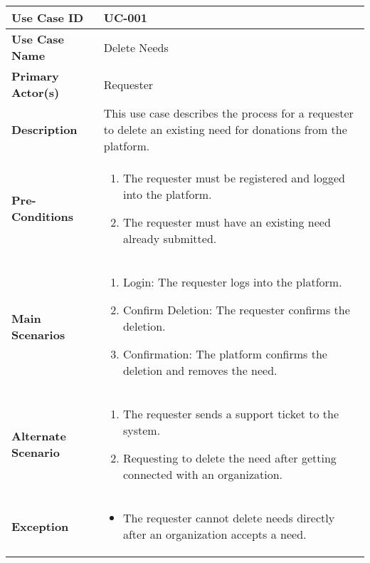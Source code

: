 \begin{table}[!ht]
    \centering
    \renewcommand{\arraystretch}{1.3} %
    \begin{tabularx}{\textwidth}{|l|X|}
        \hline
        \textbf{Use Case ID} & UC-001 \\
        \hline
        \textbf{Use Case Name} & Delete Needs \\
        \hline
        \textbf{Primary Actor(s)} & Requester \\
        \hline
        \textbf{Description} & This use case describes the process for a requester to delete an existing need for donations from the platform.\\
        \hline
        \textbf{Pre-Conditions} & 
        \begin{enumerate}[label=\arabic*.,itemsep=0pt]
            \item The requester must be registered and logged into the platform.
            \item The requester must have an existing need already submitted.
        \end{enumerate} \\
        \hline
        \textbf{Main Scenarios} & 
        \begin{enumerate}[label=\arabic*.,itemsep=0pt]
            \item Login: The requester logs into the platform.
            \item Confirm Deletion: The requester confirms the deletion.
            \item Confirmation: The platform confirms the deletion and removes the need.
        \end{enumerate} \\
        \hline
        \textbf{Alternate Scenario} & 
        \begin{enumerate}[label=\arabic*.,itemsep=0pt]
            \item The requester sends a support ticket to the system.
            \item Requesting to delete the need after getting connected with an organization.
        \end{enumerate} \\
        \hline
        \textbf{Exception} & 
        \begin{itemize}[label=--,itemsep=0pt]
            \item The requester cannot delete needs directly after an organization accepts a need.
        \end{itemize} \\

\end{tabularx}
\end{table}
